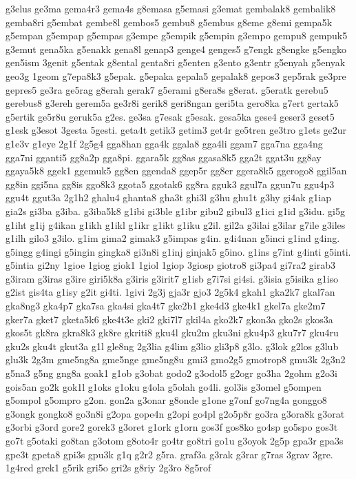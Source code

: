 {g3elus ge3ma gema4r3 gema4s g8emasa g5emasi g3emat gembalak8 gembalik8
gemba8ri g5embat gembe8l gembos5 gembu8 g5embus g8eme g8emi gempa5k
g5empan g5empap g5empas g3empe g5empik g5empin g3empo gempu8 gempuk5
g3emut gena5ka g5enakk gena8l genap3 genge4 genges5 g7engk g8engke g5engko
gen5ism 3genit g5entak g8ental genta8ri g5enten g3ento g3entr g5enyah
g5enyak geo3g 1geom g7epa8k3 g5epak. g5epaka gepala5 gepalak8 gepos3
gep5rak ge3pre gepres5 ge3ra ge5rag g8erah gerak7 g5erami g8era8s g8erat.
g5eratk gerebu5 gerebus8 g3ereh gerem5a ge3r8i gerik8 geri8ngan geri5ta
gero8ka g7ert gertak5 g5ertik ge5r8u geruk5a g2es. ge3sa g7esak g5esak.
gesa5ka gese4 geser3 geset5 g1esk g3esot 3gesta 5gesti. geta4t getik3
getim3 get4r ge5tren ge3tro g1ets ge2ur g1e3v g1eye 2g1f 2g5g4 gga8han
gga4k ggala8 gga4li ggam7 gga7na gga4ng gga7ni gganti5 gg8a2p gga8pi.
ggara5k gg8as ggasa8k5 gga2t ggat3u gg8ay ggaya5k8 ggek1 ggemuk5 gg8en
ggenda8 ggep5r gg8er ggera8k5 ggerogo8 ggil5an gg8in ggi5na gg8is ggo8k3
ggota5 ggotak6 gg8ra gguk3 ggul7a ggun7u ggu4p3 ggu4t ggut3a 2g1h2 ghalu4
ghanta8 gha3t ghi3l g3hu ghu1t g3hy gi4ak g1iap gia2s gi3ba g3iba.
g3iba5k8 g1ibi gi3ble g1ibr gibu2 gibul3 g1ici g1id g3idu. gi5g g1iht g1ij
g4ikan g1ikh g1ikl g1ikr g1ikt g1iku g2il. gil2a g3ilai g3ilar g7ile
g3iles g1ilh gilo3 g3ilo. g1im gima2 gimak3 g5impas g4in. g4i4nan g5inci
g1ind g4ing. g5ingg g4ingi g5ingin gingka8 gi3n8i g1inj ginjak5 g5ino.
g1ins g7int g4inti g5inti. g5intia gi2ny 1gioe 1giog giok1 1giol 1giop
3giosp giotro8 gi3pa4 gi7ra2 girab3 g3iram g3iras g3ire giri5k8a g3iris
g3irit7 g1isb g7i7si gi4si. g3isia g5isika g1iso g2ist gis4ta g1isy g2it
gi4ti. 1givi 2g3j gja3r gjo3 2g5k4 gkah1 gka2k7 gkal7an gka8ng3 gka4p7
gka7sa gka4si gka4t7 gke2b1 gke4d3 gke4k1 gkel7a gke2m7 gker7a gket7
gketa5k6 gke4t3e gki2 gki7l7 gkil4a gko2k7 gkon3a gko2s gkos3a gkos5t
gk8ra gkra8k3 gk8re gkriti8 gku4l gku2m gku3ni gku4p3 gku7r7 gku4ru gku2s
gku4t gkut3a g1l gle8ng 2g3lia g4lim g3lio gli3p8 g3lo. g3lok g2los g3lub
glu3k 2g3m gme5ng8a gme5nge gme5ng8u gmi3 gmo2g5 gmotrop8 gmu3k 2g3n2
g5na3 g5ng gng8a goak1 g1ob g3obat godo2 g3odol5 g2ogr go3ha 2gohm g2o3i
gois5an go2k gok1l g1oks g1oku g4ola g5olah go4li. gol3is g3omel g5ompen
g5ompol g5ompro g2on. gon2a g3onar g8onde g1one g7onf go7ng4a gonggo8
g3ongk gongko8 go3n8i g2opa gope4n g2opi go4pl g2o5p8r go3ra g3ora8k
g3orat g3orbi g3ord gore2 gorek3 g3oret g1ork g1orn gos3f gos8ko go4sp
go5spo gos3t go7t g5otaki go8tan g3otom g8oto4r go4tr go8tri go1u g3oyok
2g5p gpa3r gpa3s gpe3t gpeta8 gpi3s gpu3k g1q g2r2 g5ra. graf3a g3rak
g3rar g7ras 3grav 3gre. 1g4red grek1 g5rik gri5o gri2s g8riy 2g3ro 8g5rof
}
